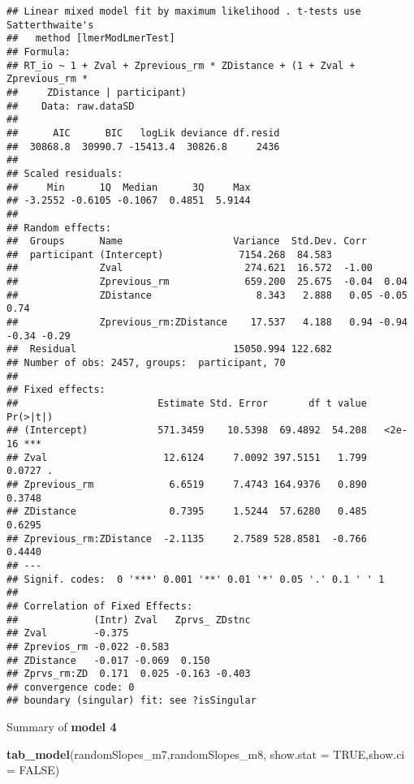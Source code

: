 \documentclass[
]{article}
\newenvironment{Shaded}{\begin{snugshade}}{\end{snugshade}}
\newcommand{\DataTypeTok}[1]{\textcolor[rgb]{0.13,0.29,0.53}{#1}}
\newcommand{\KeywordTok}[1]{\textcolor[rgb]{0.13,0.29,0.53}{\textbf{#1}}}
\newcommand{\NormalTok}[1]{#1}
\newcommand{\OtherTok}[1]{\textcolor[rgb]{0.56,0.35,0.01}{#1}}
\begin{document}
\begin{verbatim}
## Linear mixed model fit by maximum likelihood . t-tests use Satterthwaite's
##   method [lmerModLmerTest]
## Formula: 
## RT_io ~ 1 + Zval + Zprevious_rm * ZDistance + (1 + Zval + Zprevious_rm *  
##     ZDistance | participant)
##    Data: raw.dataSD
## 
##      AIC      BIC   logLik deviance df.resid 
##  30868.8  30990.7 -15413.4  30826.8     2436 
## 
## Scaled residuals: 
##     Min      1Q  Median      3Q     Max 
## -3.2552 -0.6105 -0.1067  0.4851  5.9144 
## 
## Random effects:
##  Groups      Name                   Variance  Std.Dev. Corr                   
##  participant (Intercept)             7154.268  84.583                         
##              Zval                     274.621  16.572  -1.00                  
##              Zprevious_rm             659.200  25.675  -0.04  0.04            
##              ZDistance                  8.343   2.888   0.05 -0.05  0.74      
##              Zprevious_rm:ZDistance    17.537   4.188   0.94 -0.94 -0.34 -0.29
##  Residual                           15050.994 122.682                         
## Number of obs: 2457, groups:  participant, 70
## 
## Fixed effects:
##                        Estimate Std. Error       df t value Pr(>|t|)    
## (Intercept)            571.3459    10.5398  69.4892  54.208   <2e-16 ***
## Zval                    12.6124     7.0092 397.5151   1.799   0.0727 .  
## Zprevious_rm             6.6519     7.4743 164.9376   0.890   0.3748    
## ZDistance                0.7395     1.5244  57.6280   0.485   0.6295    
## Zprevious_rm:ZDistance  -2.1135     2.7589 528.8581  -0.766   0.4440    
## ---
## Signif. codes:  0 '***' 0.001 '**' 0.01 '*' 0.05 '.' 0.1 ' ' 1
## 
## Correlation of Fixed Effects:
##             (Intr) Zval   Zprvs_ ZDstnc
## Zval        -0.375                     
## Zprevios_rm -0.022 -0.583              
## ZDistance   -0.017 -0.069  0.150       
## Zprvs_rm:ZD  0.171  0.025 -0.163 -0.403
## convergence code: 0
## boundary (singular) fit: see ?isSingular
\end{verbatim}

Summary of \textbf{model 4}

\begin{Shaded}
\begin{Highlighting}[]
\KeywordTok{tab_model}\NormalTok{(randomSlopes_m7,randomSlopes_m8, }\DataTypeTok{show.stat =} \OtherTok{TRUE}\NormalTok{,}\DataTypeTok{show.ci =} \OtherTok{FALSE}\NormalTok{)}
\end{Highlighting}
\end{Shaded}
\end{document}
